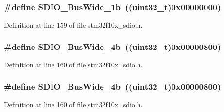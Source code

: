 \subsubsection[{\texorpdfstring{S\+D\+I\+O\+\_\+\+Bus\+Wide\+\_\+1b}{SDIO_BusWide_1b}}]{\setlength{\rightskip}{0pt plus 5cm}\#define S\+D\+I\+O\+\_\+\+Bus\+Wide\+\_\+1b~(({\bf uint32\+\_\+t})0x00000000)}\hypertarget{group___s_d_i_o___bus___wide_ga9c333b57937c5cc0a173a58519f9250a}{}\label{group___s_d_i_o___bus___wide_ga9c333b57937c5cc0a173a58519f9250a}


Definition at line 159 of file stm32f10x\+\_\+sdio.\+h.

\subsubsection[{\texorpdfstring{S\+D\+I\+O\+\_\+\+Bus\+Wide\+\_\+4b}{SDIO_BusWide_4b}}]{\setlength{\rightskip}{0pt plus 5cm}\#define S\+D\+I\+O\+\_\+\+Bus\+Wide\+\_\+4b~(({\bf uint32\+\_\+t})0x00000800)}\hypertarget{group___s_d_i_o___bus___wide_ga79815d1d798b28a2d3750ad25466ff1b}{}\label{group___s_d_i_o___bus___wide_ga79815d1d798b28a2d3750ad25466ff1b}


Definition at line 160 of file stm32f10x\+\_\+sdio.\+h.

\subsubsection[{\texorpdfstring{S\+D\+I\+O\+\_\+\+Bus\+Wide\+\_\+4b}{SDIO_BusWide_4b}}]{\setlength{\rightskip}{0pt plus 5cm}\#define S\+D\+I\+O\+\_\+\+Bus\+Wide\+\_\+4b~(({\bf uint32\+\_\+t})0x00000800)}\hypertarget{group___s_d_i_o___bus___wide_ga79815d1d798b28a2d3750ad25466ff1b}{}\label{group___s_d_i_o___bus___wide_ga79815d1d798b28a2d3750ad25466ff1b}


Definition at line 160 of file stm32f10x\+\_\+sdio.\+h.

